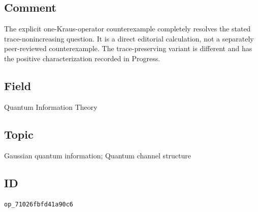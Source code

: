 \subsection*{Comment}

The explicit one-Kraus-operator counterexample completely resolves the stated trace-nonincreasing question. It is a direct editorial calculation, not a separately peer-reviewed counterexample. The trace-preserving variant is different and has the positive characterization recorded in Progress.

\subsection*{Field}

Quantum Information Theory

\subsection*{Topic}

Gaussian quantum information; Quantum channel structure

\subsection*{ID}

\texttt{op\_71026fbfd41a90c6}
